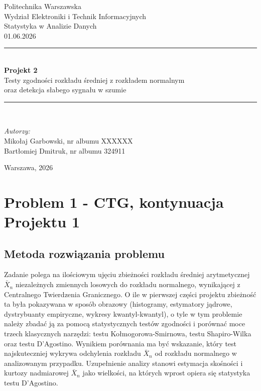 \documentclass[12pt,a4paper]{article}
\title{}
\author{}
\date{}
\begin{document}
\begin{titlepage}
    \centering
    \vspace*{2cm}

    {\Large Politechnika Warszawska}\\[0.3cm]
    {\large Wydział Elektroniki i Technik Informacyjnych}\\[2cm]

    {\large Statystyka w Analizie Danych}\\[0.5cm]
    {\large 01.06.2026}\\[1.5cm]

    \rule{\linewidth}{0.5mm}\\[0.4cm]
    {\huge\bfseries Projekt 2}\\[0.3cm]
    {\Large Testy zgodności rozkładu średniej z rozkładem normalnym\\
    oraz detekcja słabego sygnału w szumie}\\[0.2cm]
    \rule{\linewidth}{0.5mm}\\[2cm]

    \begin{flushright}
        \large
        \textit{Autorzy:}\\[0.4cm]
        Mikołaj Garbowski, nr albumu XXXXXX\\
        Bartłomiej Dmitruk, nr albumu 324911\\
    \end{flushright}

    \vfill
    {\large Warszawa, 2026}
\end{titlepage}

\tableofcontents
\newpage

\section{Problem 1 - CTG, kontynuacja Projektu 1}

\subsection{Metoda rozwiązania problemu}

Zadanie polega na ilościowym ujęciu zbieżności rozkładu średniej arytmetycznej $\bar{X}_n$ niezależnych zmiennych losowych do rozkładu normalnego, wynikającej z Centralnego Twierdzenia Granicznego. O ile w pierwszej części projektu zbieżność ta była pokazywana w sposób obrazowy (histogramy, estymatory jądrowe, dystrybuanty empiryczne, wykresy kwantyl-kwantyl), o tyle w tym problemie należy zbadać ją za pomocą statystycznych testów zgodności i porównać moce trzech klasycznych narzędzi: testu Kołmogorowa-Smirnowa, testu Shapiro-Wilka oraz testu D'Agostino. Wynikiem porównania ma być wskazanie, który test najskuteczniej wykrywa odchylenia rozkładu $\bar{X}_n$ od rozkładu normalnego w analizowanym przypadku. Uzupełnienie analizy stanowi estymacja skośności i kurtozy nadmiarowej $\bar{X}_n$ jako wielkości, na których wprost opiera się statystyka testu D'Agostino.
\end{document}
